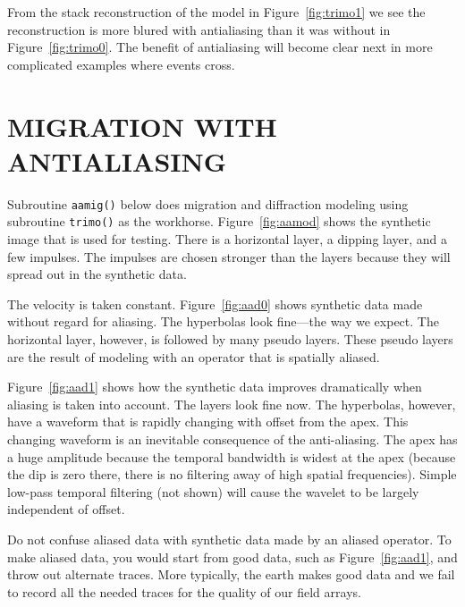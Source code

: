 

From the stack reconstruction of the model in Figure~\ref{fig:trimo1}
we see the reconstruction is more blured with antialiasing
than it was without in Figure~\ref{fig:trimo0}.
The benefit of antialiasing will become clear next
in more complicated examples where events cross.

\section{MIGRATION WITH ANTIALIASING}
Subroutine {\tt aamig()} below does migration and diffraction modeling
using subroutine {\tt trimo()} as the workhorse. %
Figure~\ref{fig:aamod} shows the synthetic image
that is used for testing.
There is a horizontal layer, a dipping layer, and a few impulses.
The impulses are chosen stronger than the layers because
they will spread out in the synthetic data.

The velocity is taken constant.
Figure~\ref{fig:aad0} shows synthetic data made without regard for aliasing.
The hyperbolas look fine---the way we expect.
The horizontal layer, however, is followed by many pseudo layers.
These pseudo layers are the result of modeling with an operator
that is spatially aliased.

Figure~\ref{fig:aad1} shows how the synthetic data improves dramatically
when aliasing is taken into account.
The layers look fine now.
The hyperbolas, however,
have a waveform that is rapidly changing
with offset from the apex.
This changing waveform is an inevitable consequence of the anti-aliasing.
The apex has a huge amplitude
because the temporal bandwidth is widest at the apex
(because the dip is zero there,
there is no filtering away of high spatial frequencies).
Simple low-pass temporal filtering (not shown)
will cause the wavelet to be largely independent of offset.

\par
Do not confuse aliased data with synthetic data made by an aliased operator.
To make aliased data, you would start from good data,
such as Figure~\ref{fig:aad1},
and throw out alternate traces.
More typically, the earth makes good data and we fail to record
all the needed traces for the quality of our field arrays.

